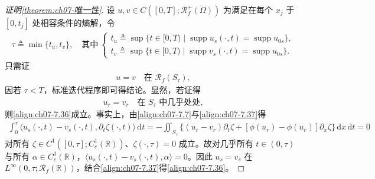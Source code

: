 \documentclass[../../main.tex]{subfiles}%
\begin{document}
\begin{proof}[证明\cref{theorem:ch07-唯一性}]
设 $u,v\in C([0,T];\mathscr{R}_f^+(\Omega))$ 为满足在每个 $x_j$ 于 $[0,t_j]$ 处相容条件的熵解，令
\begin{align}
\tau\triangleq \min\{t_u,t_v\},\quad
\text{其中}\ 
\begin{cases}
t_u\triangleq \sup\{t\in[0,T)\mid\operatorname{supp}u_s(\cdot,t)=\operatorname{supp}u_{0s}\},\\
t_v\triangleq \sup\{t\in[0,T)\mid\operatorname{supp}v_s(\cdot,t)=\operatorname{supp}u_{0s}\}.
\end{cases} \label{align:ch07-7.35}
\end{align}
只需证
\begin{align}
u=v\quad\text{在 }\mathscr{R}_f(S_\tau), \label{align:ch07-7.36}
\end{align}
因若 $\tau<T$，标准迭代程序即可得结论。显然，若证得
\begin{align}
u_r=v_r\quad\text{在 }S_\tau\text{ 中几乎处处}, \label{align:ch07-7.37}
\end{align}
则\eqref{align:ch07-7.36}成立。事实上，由\eqref{align:ch07-7.7}与\eqref{align:ch07-7.37}得
\begin{align*}
\int_0^\tau\langle u_s(\cdot,t)-v_s(\cdot,t),\partial_t\zeta(\cdot,t)\rangle\,\mathrm{d}t
=-\iint_{S_\tau}\{(u_r-v_r)\partial_t\zeta+[\phi(u_r)-\phi(u_r)]\partial_x\zeta\}\,\mathrm{d}x\,\mathrm{d}t=0
\end{align*}
对所有 $\zeta\in C^1([0,\tau];C^1_c(\mathbb{R}))$、$\zeta(\cdot,\tau)=0$ 成立。故对几乎所有 $t\in(0,\tau)$ 与所有 $\alpha\in C^1_c(\mathbb{R})$，$\langle u_s(\cdot,t)-v_s(\cdot,t),\alpha\rangle=0$。因此 $u_s=v_s$ 在 $L^\infty(0,\tau;\mathscr{R}_f(\mathbb{R}))$，结合\eqref{align:ch07-7.37}得\eqref{align:ch07-7.36}。


\end{proof}
\end{document}
